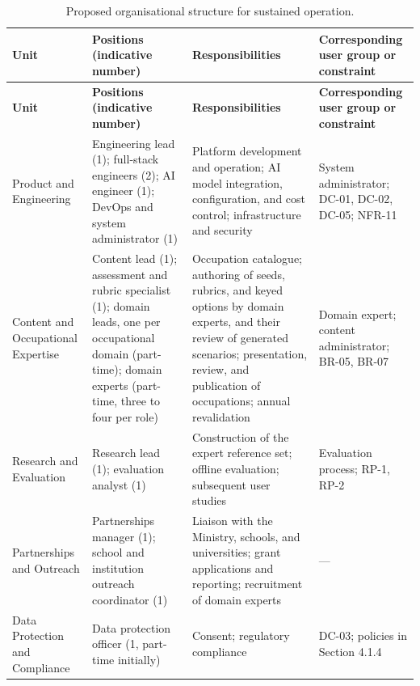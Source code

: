{\small
\begin{longtable}{|>{\raggedright\arraybackslash}p{}|>{\raggedright\arraybackslash}p{}|>{\raggedright\arraybackslash}p{}|>{\raggedright\arraybackslash}p{}|}
\caption{Proposed organisational structure for sustained operation.} \\
\hline
\textbf{Unit} & \textbf{Positions (indicative number)} & \textbf{Responsibilities} & \textbf{Corresponding user group or constraint} \\ \hline
\endfirsthead
\hline
\textbf{Unit} & \textbf{Positions (indicative number)} & \textbf{Responsibilities} & \textbf{Corresponding user group or constraint} \\ \hline
\endhead
Product and Engineering & Engineering lead (1); full-stack engineers (2); AI engineer (1); DevOps and system administrator (1) & Platform development and operation; AI model integration, configuration, and cost control; infrastructure and security & System administrator; DC-01, DC-02, DC-05; NFR-11 \\ \hline
Content and Occupational Expertise & Content lead (1); assessment and rubric specialist (1); domain leads, one per occupational domain (part-time); domain experts (part-time, three to four per role) & Occupation catalogue; authoring of seeds, rubrics, and keyed options by domain experts, and their review of generated scenarios; presentation, review, and publication of occupations; annual revalidation & Domain expert; content administrator; BR-05, BR-07 \\ \hline
Research and Evaluation & Research lead (1); evaluation analyst (1) & Construction of the expert reference set; offline evaluation; subsequent user studies & Evaluation process; RP-1, RP-2 \\ \hline
Partnerships and Outreach & Partnerships manager (1); school and institution outreach coordinator (1) & Liaison with the Ministry, schools, and universities; grant applications and reporting; recruitment of domain experts & --- \\ \hline
Data Protection and Compliance & Data protection officer (1, part-time initially) & Consent; regulatory compliance & DC-03; policies in Section 4.1.4 \\ \hline
\end{longtable}
}

